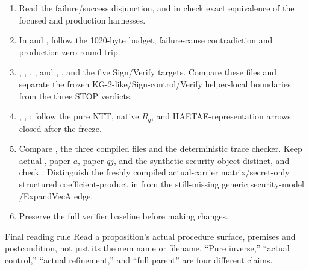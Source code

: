 \begin{enumerate}
  \item {}\newline
        Read the failure/success disjunction, and in
        \newline
        check exact equivalence of the focused and production harnesses.
  \item {}\newline
        In  and
        , follow the 1020-byte
        budget, failure-cause contradiction and production zero round trip.
  \item {}\newline
        ,\newline
        ,\newline
        ,\newline
        ,\newline
        \allowbreak
         and\newline
        \allowbreak
        ,\newline
        \allowbreak
        , and the five Sign/Verify targets.\newline
        Compare these files and separate the frozen KG-2-like/Sign-control/Verify
        helper-local boundaries from the three STOP verdicts.
  \item {},
        ,
        : follow the pure NTT, native \(R_q\),
        and HAETAE-representation arrows closed after the freeze.
  \item Compare , the three
        compiled  files and the deterministic trace
        checker. Keep actual , paper \(a\), paper \(qj\), and
        the synthetic security object distinct, and check \CurrentGate.
        Distinguish the freshly compiled actual-carrier matrix/secret-only
        structured coefficient-product in 
        from the still-missing generic security-model
        /ExpandVecA edge.
  \item Preserve the full verifier baseline before making changes.
\end{enumerate}

\begin{takeaway}{Final reading rule}
Read a proposition's actual procedure surface, premises and postcondition,
not just its theorem name or filename. ``Pure inverse,'' ``actual control,''
``actual refinement,'' and ``full parent'' are four different claims.
\end{takeaway}
